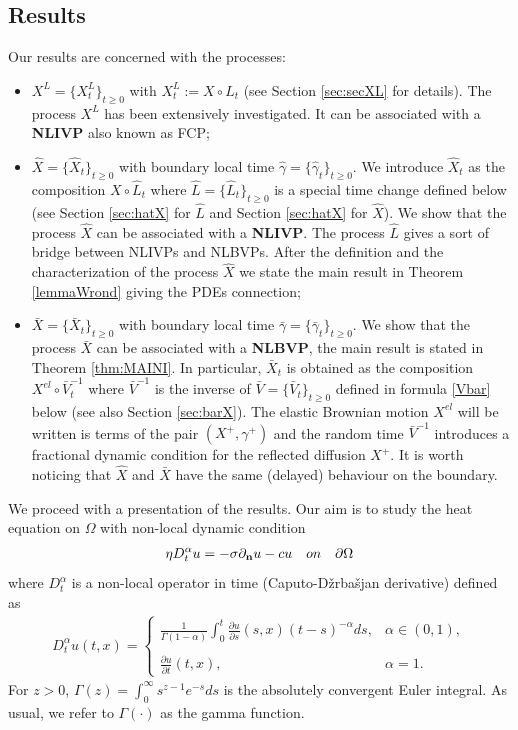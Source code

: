 \documentclass[11pt,a4paper]{article}
\begin{document}
\subsection{Results}
Our results are concerned with the processes:
\begin{itemize}
\item $X^L = \{X^L_t\}_{t\geq 0}$ with $X^L_t := X\circ L_t$ (see Section \ref{sec:secXL} for details). The process $X^L$ has been extensively investigated. It can be associated with a {\bf NLIVP} also known as FCP;
\item $\hat{X} = \{\hat{X}_t\}_{t\geq 0}$ with boundary local time $\hat{\gamma}= \{\hat{\gamma}_t\}_{t\geq 0}$.  We introduce $\hat{X}_t$ as the composition $X \circ \hat{L}_t$ where $\hat{L} = \{\hat{L}_t\}_{t \geq 0}$ is a special time change defined below (see Section \ref{sec:hatX} for $\hat{L}$ and  Section \ref{sec:hatX} for $\hat{X}$). We show that the process $\hat{X}$ can be associated with a {\bf NLIVP}. The process $\hat{L}$ gives a sort of bridge between NLIVPs and NLBVPs. After the definition and the characterization of the process $\hat{X}$ we state the main result in Theorem \ref{lemmaWrond} giving the PDEs connection;
\item $\bar{X} = \{\bar{X}_t\}_{t \geq 0}$ with boundary local time $\bar{\gamma}= \{\bar{\gamma}_t\}_{t\geq 0}$. We show that the process $\bar{X}$ can be associated with a {\bf NLBVP}, the main result is stated in Theorem \ref{thm:MAINI}. In particular, $\bar{X}_t$ is obtained as the composition $X^{el} \circ \bar{V}^{-1}_t$ where $\bar{V}^{-1}$ is the inverse of $\bar{V} = \{\bar{V}_t\}_{t\geq 0}$ defined in formula \eqref{Vbar} below (see also Section \ref{sec:barX}). The elastic Brownian motion $X^{el}$ will be written is terms of the pair $(X^+, \gamma^+)$ and the random time $\bar{V}^{-1}$ introduces a fractional dynamic condition for the reflected diffusion $X^+$.  It is worth noticing that $\hat{X}$ and $\bar{X}$ have the same (delayed) behaviour on the boundary.
\end{itemize}

We proceed with a presentation of the results. Our aim is to study the heat equation on $\Omega$ with non-local dynamic condition
\begin{align}
\eta D^\alpha_t u = - \sigma \partial_{\bf n} u - c u \quad \textrm{on} \quad \partial \Omega 
\label{DBCintro}
\end{align}
where $D^\alpha_t$ is a non-local operator in time (Caputo-D\v{z}rba\v{s}jan  derivative) defined as 
\begin{align}
D^\alpha_t u(t,x) =
\left\lbrace
\begin{array}{ll}
\displaystyle  \frac{1}{\Gamma(1-\alpha)} \int_0^t \frac{\partial u}{\partial s}(s,x) (t-s)^{-\alpha} ds, & \alpha \in (0,1),\\
\\
\displaystyle \frac{\partial u}{\partial t}(t,x), & \alpha=1.
\end{array}
\right.
\label{CDderDef}
\end{align} 
For $z>0$, $\Gamma(z) = \int_0^\infty s^{z-1} e^{-s}ds$ is the absolutely convergent Euler integral. As usual, we refer to $\Gamma(\cdot)$ as the gamma function. 
\end{document}
